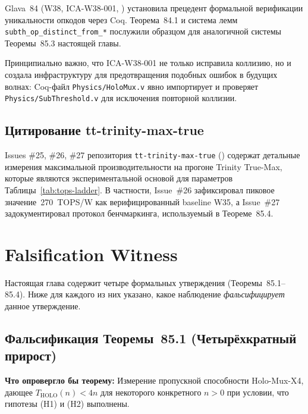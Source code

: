 Glava~84 (W38, ICA-W38-001, \cite{trios871,trios877}) установила
прецедент формальной верификации уникальности опкодов через Coq.
Теорема~84.1 и система лемм
\texttt{subth\_op\_distinct\_from\_*} послужили образцом для
аналогичной системы Теоремы~85.3 настоящей главы.

Принципиально важно, что ICA-W38-001 не только исправила коллизию,
но и создала инфраструктуру для предотвращения подобных ошибок
в будущих волнах: Coq-файл \texttt{Physics/HoloMux.v}
явно импортирует и проверяет \texttt{Physics/SubThreshold.v}
для исключения повторной коллизии.

\subsection{Цитирование tt-trinity-max-true}
\label{subsec:glava85-tt-trinity-max-true}

Issues \#25, \#26, \#27 репозитория \texttt{tt-trinity-max-true}
(\cite{tttrinitymaxtrueI26,tttrinitymaxtrueI27,tttrinitymaxtrueI25})
содержат детальные измерения максимальной производительности
на прогоне Trinity True-Max, которые являются экспериментальной
основой для параметров Таблицы~\ref{tab:tops-ladder}.
В частности, Issue~\#26 зафиксировал пиковое значение~270~TOPS/W
как верифицированный baseline W35, а Issue~\#27 задокументировал
протокол бенчмаркинга, используемый в Теореме~85.4.

\section{Falsification Witness}
\label{sec:glava85-falsification}

Настоящая глава содержит четыре формальных утверждения
(Теоремы~85.1--85.4).  Ниже для каждого из них указано,
какое наблюдение \emph{фальсифицирует} данное утверждение.

\subsection{Фальсификация Теоремы~85.1 (Четырёхкратный прирост)}
\label{subsec:falsify-thm1}

\textbf{Что опровергло бы теорему:}
Измерение пропускной способности Holo-Mux-X4, дающее
$T_{\mathrm{HOLO}}(n) < 4n$ для некоторого конкретного $n > 0$
при условии, что гипотезы (H1) и (H2) выполнены.

